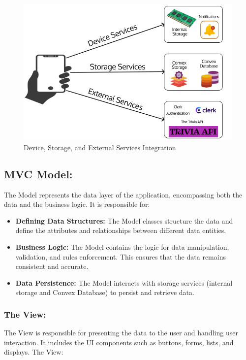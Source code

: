 \begin{figure}[H]
\centering
    \includegraphics[width=1\textwidth, height=0.4\textheight]{Images/Application Architecture.png}
\caption{Device, Storage, and External Services Integration}
\end{figure}

\subsection{MVC Model: }

The Model represents the data layer of the application, encompassing both the data and the business logic. It is responsible for:

\begin{itemize}

    \item \textbf{Defining Data Structures:} The Model classes structure the data and define the attributes and relationships between different data entities.
    \item \textbf{Business Logic:} The Model contains the logic for data manipulation, validation, and rules enforcement. This ensures that the data remains consistent and accurate.
    \item \textbf{Data Persistence:} The Model interacts with storage services (internal storage and Convex Database) to persist and retrieve data.
\end{itemize}

\subsubsection{The View:}

The View is responsible for presenting the data to the user and handling user interaction. It includes the UI components such as buttons, forms, lists, and displays. The View:

